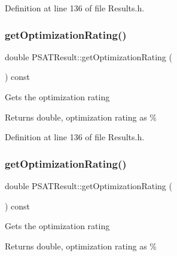 Definition at line 136 of file Results.\+h.

\mbox{\label{class_p_s_a_t_result_aa0a7001461408fcb06a6c22ce2d064db}} 
\subsubsection{\texorpdfstring{get\+Optimization\+Rating()}{getOptimizationRating()}\hspace{0.1cm}{\footnotesize\ttfamily [2/3]}}
{\footnotesize\ttfamily double P\+S\+A\+T\+Result\+::get\+Optimization\+Rating (\begin{DoxyParamCaption}{ }\end{DoxyParamCaption}) const\hspace{0.3cm}{\ttfamily [inline]}}

Gets the optimization rating \begin{DoxyReturn}{Returns}
double, optimization rating as \% 
\end{DoxyReturn}


Definition at line 136 of file Results.\+h.

\mbox{\label{class_p_s_a_t_result_aa0a7001461408fcb06a6c22ce2d064db}} 
\subsubsection{\texorpdfstring{get\+Optimization\+Rating()}{getOptimizationRating()}\hspace{0.1cm}{\footnotesize\ttfamily [3/3]}}
{\footnotesize\ttfamily double P\+S\+A\+T\+Result\+::get\+Optimization\+Rating (\begin{DoxyParamCaption}{ }\end{DoxyParamCaption}) const\hspace{0.3cm}{\ttfamily [inline]}}

Gets the optimization rating \begin{DoxyReturn}{Returns}
double, optimization rating as \% 
\end{DoxyReturn}


